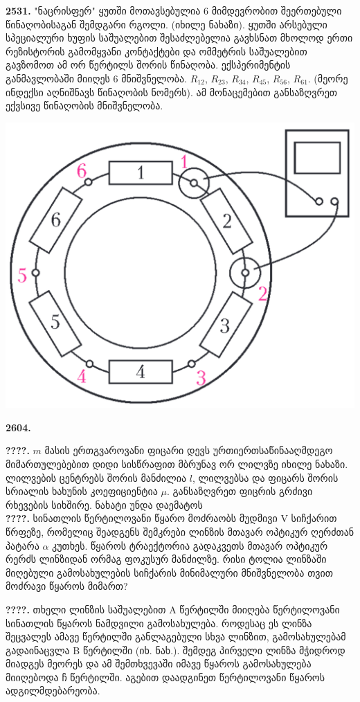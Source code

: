 \documentclass[12pt,a4paper,]{report}
\begin{document}
\textbf{2531.} "ნაცრისფერ" ყუთში მოთავსებულია 6 მიმდევრობით შეერთებული წინაღობისაგან შემდგარი რგოლი. (იხილე ნახაზი). ყუთში არსებული სპეციალური ხუფის საშუალებით შესაძლებელია გავხსნათ მხოლოდ ერთი რეზისტორის გამომყვანი კონტაქტები და ომმეტრის საშუალებით გავზომოთ ამ ორ წერტილს შორის წინაღობა. ექსპერიმენტის განმავლობაში მიიღეს 6 მნიშვნელობა. $R_{12}$, $R_{23}$, $R_{34}$, $R_{45}$, $R_{56}$, $R_{61}$. (მეორე ინდექსი აღნიშნავს წინაღობის ნომერს). ამ მონაცემებით განსაზღვრეთ ექვსივე წინაღობის მნიშვნელობა.
	\begin{center}
		\includegraphics[scale=0.3]{images/F2531.png}
	\end{center}

\textbf{2604.} 

\textbf{????.} $m$ მასის ერთგვაროვანი ფიცარი დევს ურთიერთსაწინააღმდეგო მიმართულებებით დიდი სისწრაფით მბრუნავ ორ ლილვზე იხილე ნახაზი. ლილვების ცენტრებს შორის მანძილია $l$, ლილვებსა და ფიცარს შორის სრიალის ხახუნის კოეფიციენტია $\mu$. განსაზღვრეთ ფიცრის გრძივი რხევების სიხშირე.
	ნახატი უნდა დაემატოს\\
	
\textbf{????.} სინათლის წერტილოვანი წყარო მოძრაობს მუდმივი V სიჩქარით წრფეზე, რომელიც შეადგენს შემკრები ლინზის მთავარ ოპტიკურ ღერძთან  პატარა $\alpha$ კუთხეს. წყაროს ტრაექტორია გადაკვეთს მთავარ ოპტიკურ რერძს ლინზიდან ორმაგ ფოკუსურ მანძილზე. რისი ტოლია ლინზაში მიღებული გამოსახულების სიჩქარის მინიმალური მნიშვნელობა თვით მოძრავი წყაროს მიმართ?

\textbf{????.} თხელი ლინზის საშუალებით A წერტილში მიიღება წერტილოვანი სინათლის წყაროს ნამდვილი გამოსახულება. როდესაც ეს ლინზა შეცვალეს ამავე წერტილში განლაგებული სხვა ლინზით, გამოსახულებამ გადაინაცვლა B წერტილში (იხ. ნახ.). შემდეგ პირველი ლინზა მჭიდროდ მიადგეს მეორეს და ამ შემთხვევაში იმავე წყაროს გამოსახულება მიიღებოდა ჩ წერტილში. აგებით დაადგინეთ წერტილოვანი წყაროს ადგილმდებარეობა.
\end{document}
